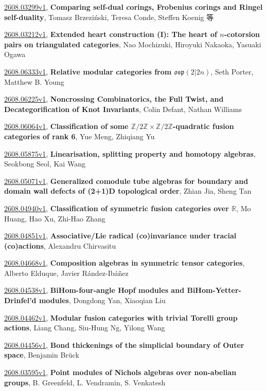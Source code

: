 \documentclass[9pt, a4paper]{article}
\theoremstyle{plain}
\theoremstyle{definition}
\theoremstyle{remark}
\newcommand{\arxiv}[3]{\href{https://arxiv.org/abs/#1}{#1}, \textbf{\textcolor{arxivblue}{#2}}, #3}
\begin{document}
\arxiv{2608.03299v1}{Comparing self-dual corings, Frobenius corings and Ringel self-duality}{Tomasz Brzeziński, Teresa Conde, Steffen Koenig 等}

\arxiv{2608.03212v1}{Extended heart construction (I): The heart of $n$-cotorsion pairs on triangulated categories}{Nao Mochizuki, Hiroyuki Nakaoka, Yasuaki Ogawa}

\arxiv{2608.06333v1}{Relative modular categories from $\mathfrak{osp}(2 \vert 2n)$}{Seth Porter, Matthew B. Young}

\arxiv{2608.06225v1}{Noncrossing Combinatorics, the Full Twist, and Decategorification of Knot Invariants}{Colin Defant, Nathan Williams}

\arxiv{2608.06064v1}{Classification of some $\mathbb{Z}/2\mathbb{Z}\times \mathbb{Z}/2\mathbb{Z}$-quadratic fusion categories of rank 6}{Yue Meng, Zhiqiang Yu}

\arxiv{2608.05875v1}{Linearisation, splitting property and homotopy algebras}{Seokbong Seol, Kai Wang}

\arxiv{2608.05071v1}{Generalized comodule tube algebras for boundary and domain wall defects of (2+1)D topological order}{Zhian Jia, Sheng Tan}

\arxiv{2608.04940v1}{Classification of symmetric fusion categories over $\mathbb{R}$}{Mo Huang, Hao Xu, Zhi-Hao Zhang}

\arxiv{2608.04851v1}{Associative/Lie radical (co)invariance under tracial (co)actions}{Alexandru Chirvasitu}

\arxiv{2608.04668v1}{Composition algebras in symmetric tensor categories}{Alberto Elduque, Javier Rández-Ibáñez}

\arxiv{2608.04538v1}{BiHom-four-angle Hopf modules and BiHom-Yetter-Drinfel'd modules}{Dongdong Yan, Xiaoqian Liu}

\arxiv{2608.04462v1}{Modular fusion categories with trivial Torelli group actions}{Liang Chang, Siu-Hung Ng, Yilong Wang}

\arxiv{2608.04456v1}{Bond thickenings of the simplicial boundary of Outer space}{Benjamin Brück}

\arxiv{2608.03595v1}{Point modules of Nichols algebras over non-abelian groups}{B. Greenfeld, L. Vendramin, S. Venkatesh}

\end{document}
